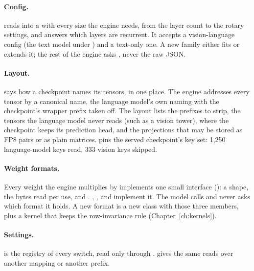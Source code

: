 \paragraph{Config.}  reads  into a  with every size the engine needs, from the layer count to the rotary settings, and answers which layers are recurrent. It accepts a vision-language config (the text model under ) and a text-only one. A new family either fits  or extends it; the rest of the engine asks , never the raw JSON.

\paragraph{Layout.}  says how a checkpoint names its tensors, in one place. The engine addresses every tensor by a canonical name, the language model's own naming with the checkpoint's wrapper prefix taken off. The layout lists the prefixes to strip, the tensors the language model never reads (such as a vision tower), where the checkpoint keeps its prediction head, and the projections that may be stored as FP8 pairs or as plain matrices.  pins the served checkpoint's key set: 1,250 language-model keys read, 333 vision keys skipped.

\paragraph{Weight formats.} Every weight the engine multiplies by implements one small interface (): a shape, the bytes read per use, and . , ,  and  implement it. The model calls  and never asks which format it holds. A new format is a new class with those three members, plus a kernel that keeps the row-invariance rule (Chapter~\ref{ch:kernels}).

\paragraph{Settings.}  is the registry of every  switch, read only through .  gives the same reads over another mapping or another prefix.

